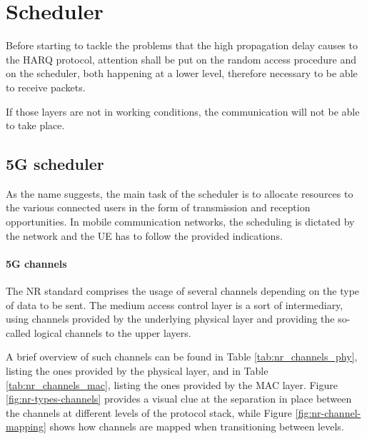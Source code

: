 
\chapter{Scheduler}
\label{chp:scheduling_problems}

Before starting to tackle the problems that the high propagation delay causes to the \ac{HARQ} protocol, attention shall be put on the random access procedure and on the scheduler, both happening at a lower level, therefore necessary to be able to receive packets.

If those layers are not in working conditions, the communication will not be able to take place.

\section{5G scheduler}
As the name suggests, the main task of the scheduler is to allocate resources to the various connected users in the form of transmission and reception opportunities. In mobile communication networks, the scheduling is dictated by the network and the \ac{UE} has to follow the provided indications.

\subsubsection{5G channels}
The \ac{NR} standard comprises the usage of several channels depending on the type of data to be sent. The medium access control layer is a sort of intermediary, using channels provided by the underlying physical layer and providing the so-called logical channels to the upper layers.

A brief overview of such channels can be found in Table \ref{tab:nr_channels_phy}, listing the ones provided by the physical layer, and in Table \ref{tab:nr_channels_mac}, listing the ones provided by the \ac{MAC} layer. Figure \ref{fig:nr-types-channels} provides a visual clue at the separation in place between the channels at different levels of the protocol stack, while Figure \ref{fig:nr-channel-mapping} shows how channels are mapped when transitioning between levels.

